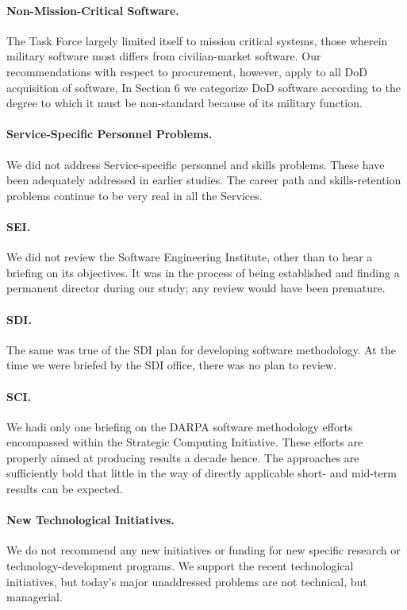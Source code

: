 \documentclass[12pt]{article}
\begin{document}
\paragraph{Non-Mission-Critical Software.} The Task Force largely limited
itself to mission critical systems, those wherein military software most
differs from civilian-market software.  Our recommendations with respect to
procurement, however, apply to all DoD acquisition of software, In Section 6 we
categorize DoD software according to the degree to which it must be
non-standard because of its military function.

\paragraph{Service-Specific Personnel Problems.} We did not address
Service-specific personnel and skills problems. These have been adequately
addressed in earlier studies. The career path and skills-retention problems
continue to be very real in all the Services.

\paragraph{SEI.} We did not review the Software Engineering Institute, other
than to hear a briefing on its objectives. It was in the process of being
established and finding a permanent director during our study; any review would
have been premature.

\paragraph{SDI.} The same was true of the SDI plan for developing software
methodology. At the time we were briefed by the SDI office, there was no plan
to review.

\paragraph{SCI.} We hadi only one briefing on the DARPA software methodology
efforts encompassed within the Strategic Computing Initiative. These efforts
are properly aimed at producing results a decade hence. The approaches are
sufficiently bold that little in the way of directly applicable short- and
mid-term results can be expected.

\paragraph{New Technological Initiatives.} We do not recommend any new
initiatives or funding for new specific research or technology-development
programs. We support the recent technological initiatives, but today's major
unaddressed problems are not technical, but managerial.
\end{document}
